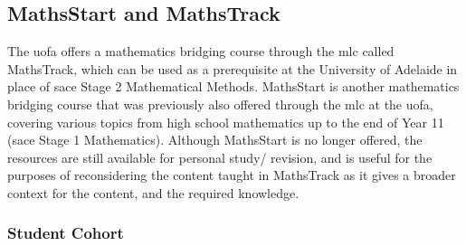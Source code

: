 \documentclass[twoside,12pt,a4paper]{report}
\begin{document}
%





\subsection{MathsStart and MathsTrack}

The \gls{uofa} offers a mathematics bridging course through the \gls{mlc} called MathsTrack, which can be used as a prerequisite at the University of Adelaide in place of \gls{sace} Stage 2 Mathematical Methods. MathsStart is another mathematics bridging course that was previously also offered through the \gls{mlc} at the \gls{uofa}, covering various topics from high school mathematics up to the end of Year 11 (\gls{sace} Stage 1 Mathematics). Although MathsStart is no longer offered, the resources are still available for personal study/ revision, and is useful for the purposes of reconsidering the content taught in MathsTrack as it gives a broader context for the content, and the required knowledge.

\subsubsection{Student Cohort}
\end{document}
